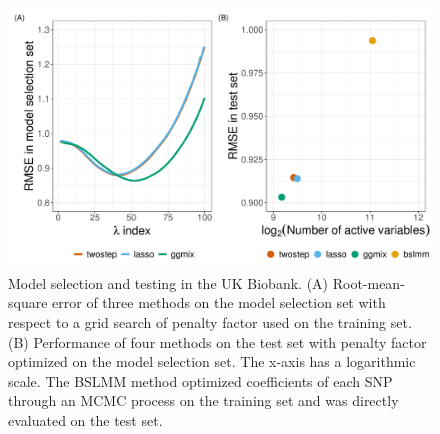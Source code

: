 \documentclass[12pt,letter]{article}\usepackage[]{graphicx}\usepackage[]{color}
\newenvironment{knitrout}{}{} %
\begin{document}
\begin{knitrout}\scriptsize
{}\color{fgcolor}\begin{figure}[H]

{\centering \includegraphics[width=1\linewidth]{figure/UKB-Figure-1} 

}

\caption[Model selection and testing in the UK Biobank]{Model selection and testing in the UK Biobank. (A) Root-mean-square error of three methods on the model selection set with respect to a grid search of penalty factor used on the training set. (B) Performance of four methods on the test set with penalty factor optimized on the model selection set. The x-axis has a logarithmic scale. The BSLMM method optimized coefficients of each SNP through an MCMC process on the training set and was directly evaluated on the test set.}\label{fig:UKB-Figure}
\end{figure}


\end{knitrout}
\end{document}

